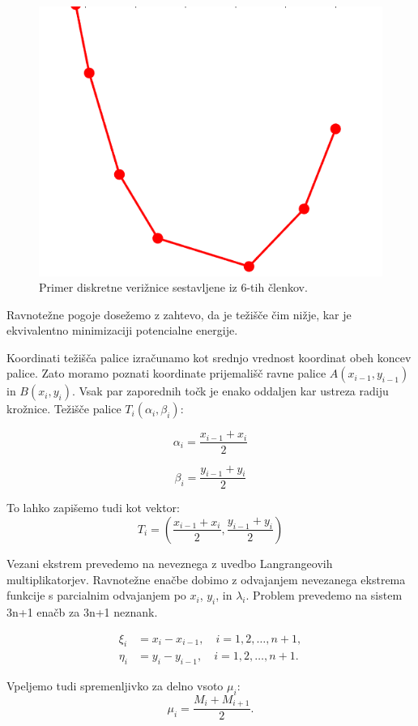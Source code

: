 \documentclass{article}
\begin{document}
        \begin{figure}[h!]
        \centering
        \includegraphics[width=0.5\linewidth]{primerDiskretneVeriznice.png}
        \caption{Primer diskretne verižnice sestavljene iz 6-tih členkov.}
        \label{slika1:diskretna}
        \end{figure}

        Ravnotežne pogoje dosežemo z zahtevo, da je težišče čim nižje, kar je ekvivalentno minimizaciji potencialne energije.
        
        Koordinati težišča palice izračunamo kot srednjo vrednost koordinat obeh koncev palice. Zato moramo poznati koordinate prijemališč ravne palice \(A(x_{i-1}, y_{i-1})\) in \(B(x_i, y_i)\). Vsak par zaporednih točk je enako oddaljen kar ustreza radiju krožnice. 
        Težišče palice \(T_i(\alpha_i, \beta_i)\):

        \[
        \alpha_i = \frac{x_{i-1} + x_i}{2}
        \]
        
        \[
        \beta_i = \frac{y_{i-1} + y_i}{2}
        \]
        
        To lahko zapišemo tudi kot vektor:
        \[
        T_i = \left( \frac{x_{i-1} + x_i}{2}, \frac{y_{i-1} + y_i}{2} \right)
        \]

        Vezani ekstrem prevedemo na neveznega z uvedbo Langrangeovih multiplikatorjev. Ravnotežne enačbe dobimo z odvajanjem nevezanega ekstrema funkcije s parcialnim odvajanjem po \(x_i\), \(y_i\), in \(\lambda_i\). Problem prevedemo na sistem 3n+1 enačb za 3n+1 neznank.

        \begin{align*}
            \xi_i &= x_i - x_{i-1}, \quad i = 1, 2, \ldots, n+1, \\
            \eta_i &= y_i - y_{i-1}, \quad i = 1, 2, \ldots, n+1.
        \end{align*}

         Vpeljemo tudi spremenljivko za delno vsoto \(\mu_i\): 
        \begin{equation*}
        \mu_i = \frac{M_i + M_{i+1}}{2}.
        \end{equation*}
\end{document}
